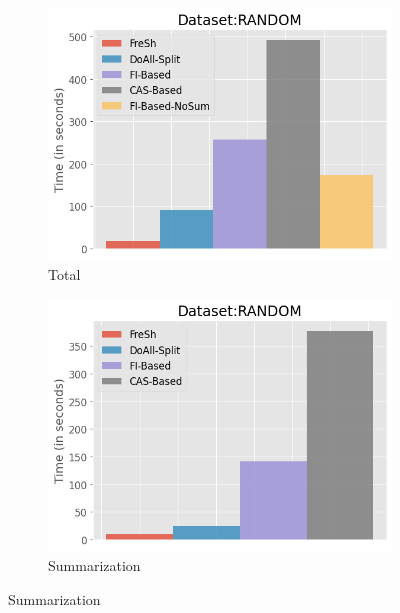 \begin{figure}[htbp]
    \centering
    \begin{subfigure}{0.45\textwidth}  
        \includegraphics[width=\textwidth]{figures/Experiments/baselines-random-total.png}
        \caption{Total}
        \label{fig:eval:baselines:random:100GB:total}
    \end{subfigure}    
    \begin{subfigure}{0.45\textwidth}  
        \includegraphics[width=\textwidth]{figures/Experiments/baselines-random-summarization.png}
        \caption{Summarization}
        \label{fig:eval:baselines:random:100GB:summarization}
    \end{subfigure}    


\end{figure}
